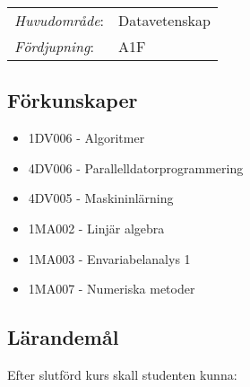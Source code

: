 \begin{tabular}{ll}\emph{Huvudområde}: & Datavetenskap\tabularnewline\emph{Fördjupning}: & A1F\tabularnewline\end{tabular}

\subsection*{Förkunskaper}

\begin{itemize}
\tightlist
\item
  1DV006 - Algoritmer
\item
  4DV006 - Parallelldatorprogrammering
\item
  4DV005 - Maskininlärning
\item
  1MA002 - Linjär algebra
\item
  1MA003 - Envariabelanalys 1
\item
  1MA007 - Numeriska metoder
\end{itemize}

\subsection*{Lärandemål}

Efter slutförd kurs skall studenten kunna:

